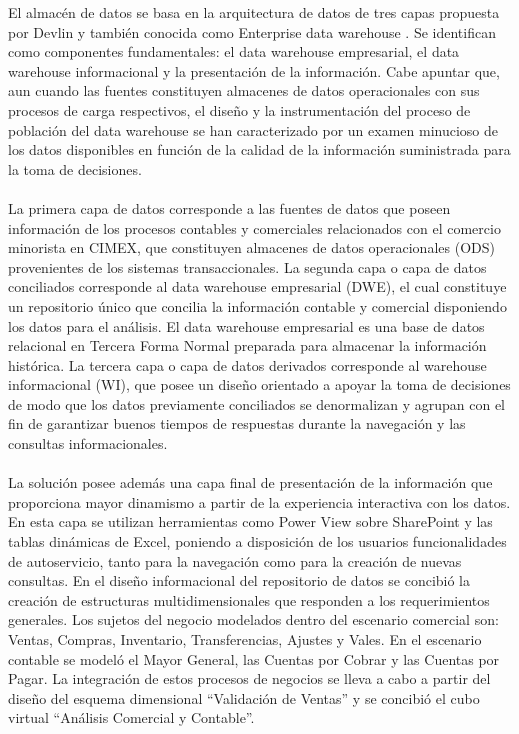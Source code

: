 \documentclass[preprint,12pt]{elsarticle}
\begin{document}
El almacén de datos se basa en la arquitectura de datos de tres capas propuesta por Devlin  y también conocida como Enterprise data warehouse . Se identifican como componentes fundamentales: el data warehouse empresarial, el data warehouse informacional y la presentación de la información. Cabe apuntar que, aun cuando las  fuentes constituyen almacenes de datos operacionales con sus procesos  de carga respectivos, el  diseño y la  instrumentación del  proceso de población del  data warehouse se  han caracterizado  por  un  examen  minucioso  de  los  datos  disponibles  en  función  de  la  calidad  de  la información suministrada para la toma de decisiones.  \\ 
\\
La primera capa de datos corresponde a las  fuentes de  datos que poseen información de los  procesos contables y comerciales relacionados con el comercio minorista en CIMEX, que constituyen almacenes de datos operacionales (ODS) provenientes de los sistemas transaccionales.  La segunda capa o capa de datos conciliados corresponde al data warehouse empresarial (DWE), el cual constituye un repositorio único que concilia la  información contable  y comercial disponiendo los datos para el análisis. El data warehouse empresarial es una base de datos relacional en Tercera Forma Normal preparada para almacenar la información histórica.  La tercera capa o capa de datos derivados corresponde al  warehouse informacional (WI), que posee un diseño  orientado  a apoyar  la  toma de  decisiones  de  modo  que los  datos  previamente  conciliados  se denormalizan y agrupan con el fin de garantizar buenos tiempos de respuestas durante la navegación y las consultas informacionales.  \\ 
\\
La  solución posee  además una  capa final  de presentación  de la  información que  proporciona  mayor dinamismo a partir de la experiencia interactiva con los datos. En esta capa se utilizan herramientas como Power View  sobre SharePoint y las  tablas dinámicas  de Excel, poniendo a  disposición de los  usuarios funcionalidades de autoservicio, tanto para la navegación como para la creación de nuevas consultas.  En  el  diseño  informacional  del  repositorio  de  datos  se  concibió  la  creación  de  estructuras multidimensionales  que  responden a  los requerimientos  generales. Los  sujetos del  negocio  modelados dentro del escenario comercial son: Ventas, Compras, Inventario, Transferencias, Ajustes y Vales. En el escenario contable se modeló el Mayor General, las Cuentas por Cobrar y las  Cuentas por Pagar.  La integración de  estos procesos  de negocios se  lleva a  cabo a  partir del diseño del esquema dimensional “Validación de Ventas” y se concibió el cubo virtual “Análisis Comercial y Contable”.  
\end{document}

